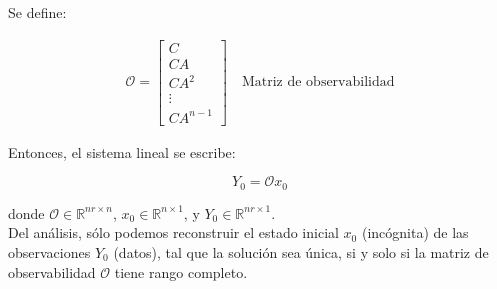 


Se define:

\begin{align*}
    \mathcal{O}=\left[
    \begin{array}{c}
     C\\ \hline CA \\ \hline CA^2 \\ \hline \vdots \\ \hline CA^{n-1} 
    \end{array}\right] \quad \text{Matriz de observabilidad}
\end{align*}

Entonces, el sistema lineal se escribe:

$$ Y_0 = \mathcal{O} x_0 $$

\noindent donde $\mathcal{O} \in \mathbb{R}^{nr \times n}$, $x_0 \in \mathbb{R}^{n \times 1}$, y $Y_0 \in \mathbb{R}^{nr \times 1}$.\\

Del análisis, sólo podemos reconstruir el estado inicial $x_0$ (incógnita) de las observaciones $Y_0$ (datos), tal que la solución sea única, si y solo si la matriz de observabilidad $\mathcal{O}$ tiene rango completo.


